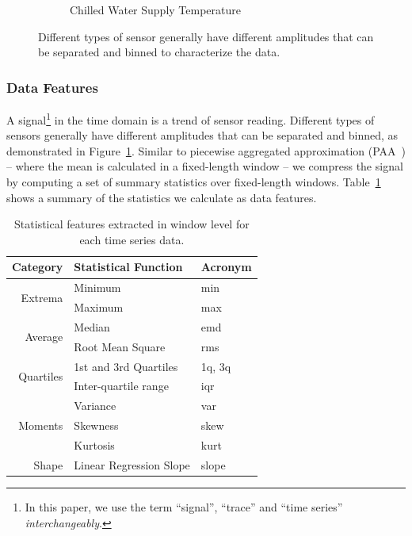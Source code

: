 \begin{figure}[ht!]
\begin{subfigure}{0.32\textwidth}
                \caption{Chilled Water Supply Temperature}
  \end{subfigure}
\caption{Different types of sensor generally have different amplitudes that can be separated and binned to characterize the data.}
\label{fig:example}
\end{figure}

\subsubsection{Data Features}
A signal\footnote{In this paper, we use the term ``signal'', ``trace'' and ``time series'' \textit{interchangeably}.} in the time domain is a trend of sensor reading.
Different types of sensors generally have different amplitudes that can be separated and binned,
as demonstrated in Figure~\ref{fig:example}.
Similar to piecewise aggregated approximation (PAA~\cite{paa}) -- where the mean is calculated in a fixed-length window --
we compress the signal by computing a set of summary statistics over fixed-length windows.
Table~\ref{table:fd} shows a summary of the statistics we calculate as data features.


\begin{table}[h]
\centering
\begin{tabular}{r|l|l}
\hline
Category                   & Statistical Function & \multicolumn{1}{l}{Acronym} \\ \hline\hline
\multirow{2}{*}{Extrema}   & Minimum                 & min                          \\ \cline{3-3}
                           & Maximum                 & max                          \\ \hline
\multirow{2}{*}{Average}   & Median                  & emd                          \\ \cline{3-3}
                           & Root Mean Square        & rms                          \\ \hline
\multirow{2}{*}{Quartiles} & 1st and 3rd Quartiles   & 1q, 3q                       \\ \cline{3-3}
                           & Inter-quartile range    & iqr                          \\ \hline
\multirow{3}{*}{Moments}   & Variance                & var                          \\ \cline{3-3}
                           & Skewness                & skew                         \\ \cline{3-3}
                           & Kurtosis                & kurt                         \\ \hline
Shape                      & Linear Regression Slope & slope                        \\ \hline
\end{tabular}
\caption{Statistical features extracted in window level for each time series data.}
\label{table:fd}
\end{table}


